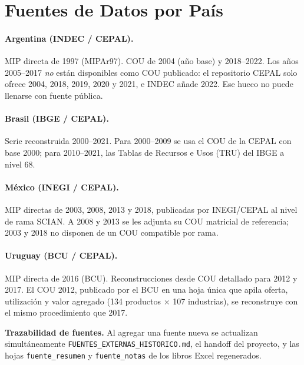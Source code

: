 \documentclass[11pt,a4paper]{article}
\begin{document}
\section{Fuentes de Datos por País}
\label{sec:fuentes}

\paragraph{Argentina (INDEC / CEPAL).}
MIP directa de 1997 (MIPAr97). COU de 2004 (año base) y 2018--2022. Los años
2005--2017 \emph{no} están disponibles como COU publicado: el repositorio CEPAL
solo ofrece 2004, 2018, 2019, 2020 y 2021, e INDEC añade 2022. Ese hueco no puede
llenarse con fuente pública.

\paragraph{Brasil (IBGE / CEPAL).}
Serie reconstruida 2000--2021. Para 2000--2009 se usa el COU de la CEPAL con base
2000; para 2010--2021, las Tablas de Recursos e Usos (TRU) del IBGE a nivel 68.

\paragraph{México (INEGI / CEPAL).}
MIP directas de 2003, 2008, 2013 y 2018, publicadas por INEGI/CEPAL al nivel de
rama SCIAN. A 2008 y 2013 se les adjunta su COU matricial de referencia; 2003 y
2018 no disponen de un COU compatible por rama.

\paragraph{Uruguay (BCU / CEPAL).}
MIP directa de 2016 (BCU). Reconstrucciones desde COU detallado para 2012 y 2017.
El COU 2012, publicado por el BCU en una hoja única que apila oferta, utilización
y valor agregado (134 productos $\times$ 107 industrias), se reconstruye con el
mismo procedimiento que 2017.

\medskip
\noindent\textbf{Trazabilidad de fuentes.} Al agregar una fuente nueva se
actualizan simultáneamente \texttt{FUENTES\_EXTERNAS\_HISTORICO.md}, el handoff
del proyecto, y las hojas \texttt{fuente\_resumen} y \texttt{fuente\_notas} de los
libros Excel regenerados.

\end{document}
